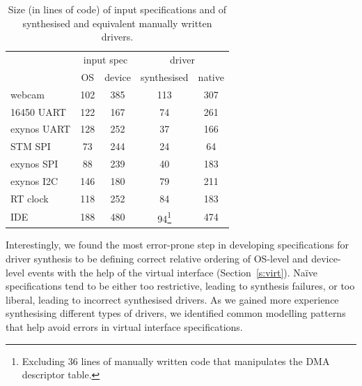 \begin{table}
    \begin{minipage}{\linewidth}
    \center
    \begin{tabular}{|l|c|c|c|c|}
        \hline
        & \multicolumn{2}{|c|}{input spec} & \multicolumn{2}{c|}{driver} \\
        \cline{2-5}
                     & OS  & device & synthesised & native \\
        \hline
        \hline
        webcam       & 102 & 385    & 113         & 307 \\
        16450 UART   & 122 & 167    & 74          & 261 \\
        exynos UART  & 128 & 252    & 37          & 166 \\
        STM SPI      & 73  & 244    & 24          & 64  \\
        exynos SPI   & 88  & 239    & 40          & 183 \\
        exynos I2C   & 146 & 180    & 79          & 211 \\
        RT clock     & 118 & 252    & 84          & 183 \\
        IDE          & 188 & 480    & 94\footnote{Excluding 36 lines of manually written code that manipulates the DMA descriptor table.} & 474 \\
        \hline
    \end{tabular}
    \end{minipage}
    \caption{Size (in lines of code) of input specifications and of synthesised and equivalent manually written drivers.}
    \label{t:size}
\end{table}

Interestingly, we found the most error-prone step in developing specifications for driver synthesis to be defining correct relative ordering of OS-level and device-level events with the help of the virtual interface (Section~\ref{s:virt}).  Na\"ive specifications tend to be either too restrictive, leading to synthesis failures, or too liberal, leading to incorrect synthesised drivers. As we gained more experience synthesising different types of drivers, we identified common modelling patterns that help avoid errors in virtual interface specifications.  

